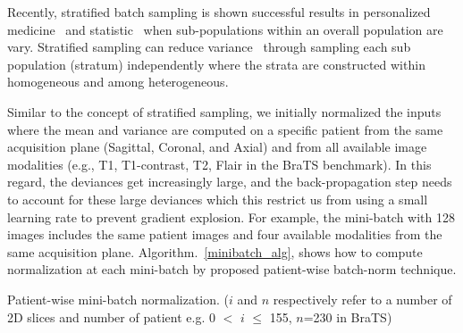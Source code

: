 \documentclass[10pt,twocolumn,letterpaper]{article}
\begin{document}
Recently, stratified batch sampling is shown successful results in personalized medicine~\cite{kim2013stratified} and statistic~\cite{keramat1998study} when sub-populations within an overall population are vary. Stratified sampling can reduce variance~\cite{zhao2014accelerating} through sampling each sub population (stratum) independently where the strata are constructed within homogeneous and among heterogeneous.

Similar to the concept of stratified sampling, we initially normalized the inputs where the mean and variance are computed on a specific patient from the same acquisition plane (Sagittal, Coronal, and Axial) and from all available image modalities (e.g., T1, T1-contrast, T2, Flair in the BraTS benchmark).
In this regard, the deviances get increasingly large, and the back-propagation step needs to account for these large deviances which this restrict us from using a small learning rate to prevent gradient explosion. For example, the mini-batch with 128 images includes the same patient images and four available modalities from the same acquisition plane. Algorithm.~\ref{minibatch_alg}, shows how to compute normalization at each mini-batch by proposed patient-wise batch-norm technique.

\begin{algorithm}



\caption{Patient-wise mini-batch normalization. ($i$ and $n$ respectively refer to a number of 2D slices and number of patient e.g. 0 $<$ $i$ $\leq$ 155, $n$=230 in BraTS)}
\label{minibatch_alg}
\end{algorithm}
\end{document}
